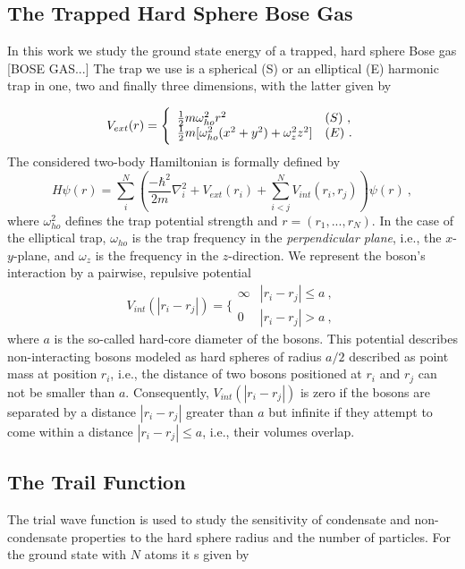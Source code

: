\documentclass[11pt,a4paper]{article}
\numberwithin{equation}{section}
\begin{document}
\subsection{The Trapped Hard Sphere Bose Gas}
%
In this work we study the ground state energy of a trapped, hard sphere Bose gas
[BOSE GAS...]
%
The trap we use is a spherical (S) or an elliptical (E) harmonic trap in one, two and finally three dimensions, with the latter given by

\begin{equation}
V_{ext}(r) = 
\Bigg\{
\begin{array}{ll}
\frac{1}{2}m\omega_{ho}^2r^2 & (S)~,\\
\strut
\frac{1}{2}m[\omega_{ho}^2(x^2+y^2) + \omega_z^2z^2] & (E)~.
\label{trap_eqn}
\end{array}
\end{equation}
The considered two-body Hamiltonian is formally defined by
\begin{equation}
H\psi(r) = \sum_i^N \left(\frac{-\hbar^2}{2m}{\nabla }_{i}^2 +V_{ext}({{r}}_i)  +
\sum_{i<j}^{N} V_{int}({{r}}_i,{{r}}_j)\right)\psi(r)~,
\end{equation}
where $\omega_{ho}^2$ defines the trap potential strength and $r = (r_1,...,r_N)$.  
%
In the case of the elliptical trap, $\omega_{ho}$ is the trap frequency in the {\it perpendicular plane}, i.e., the $x$-$y$-plane, and $\omega_z$ is the frequency in the $z$-direction.  
%
We represent the boson's interaction by a pairwise, repulsive potential
\begin{equation}
V_{int}(|{r}_i-{r}_j|) =  \Bigg\{
\begin{array}{ll}
\infty & {|{r}_i-{r}_j|} \leq {a}~,\\
0 & {|{r}_i-{r}_j|} > {a}~,
\end{array}
\end{equation}
where $a$ is the so-called hard-core diameter of the bosons.
%
This potential describes non-interacting bosons modeled as hard spheres of radius $a/2$ described as point mass at position $r_i$, i.e., the distance of two bosons positioned at $r_i$ and $r_j$ can not be smaller than $a$.   
%
Consequently, $V_{int}(|{r}_i-{r}_j|)$ is zero if the bosons are separated by a distance $|{r}_i-{r}_j|$ greater than $a$ but infinite if they attempt to come within a distance $|{r}_i-{r}_j| \leq a$, i.e., their volumes overlap.

%
\subsection{The Trail Function}
%
%
The trial wave function is used to study the sensitivity of condensate and non-condensate properties to the hard sphere radius and the number of particles.
%
For the ground state with $N$ atoms it s given by
\end{document}
